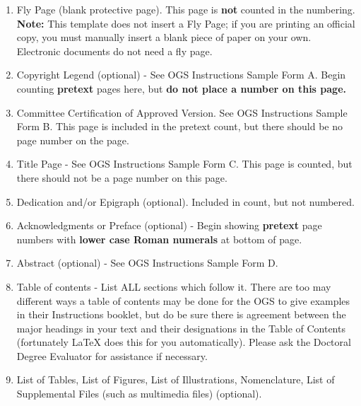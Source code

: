 \begin{enumerate}

\item Fly Page 
%
(blank protective page). This page is \textbf{not} counted in the numbering.
\textbf{Note:} This template does not insert a Fly Page; if you are printing
an official copy, you must manually insert a blank piece of paper on your own.
Electronic documents do not need a fly page.

\item Copyright Legend 
%
(optional) - See OGS Instructions Sample Form A.
Begin counting \textbf{pretext} pages here, but \textbf{do not
place a number on this page.} 

\item Committee Certification of Approved Version.
%
See OGS Instructions Sample Form B. This page is included in the
pretext count, but there should be no page number on the page.

\item Title Page - 
%
See OGS Instructions Sample Form C.
This page is counted, but there should not be a page number on this page.

\item Dedication 
%
and/or Epigraph (optional). 
%
Included in count, but not numbered.

\item Acknowledgments
%
or Preface 
%
(optional) - Begin showing \textbf{pretext} page numbers with \textbf{lower
case Roman numerals} at bottom of page.

\item Abstract 
%
(optional) - See OGS Instructions Sample Form D.

\item Table of contents -
%
List ALL sections which follow it. There are too may different ways a table
of contents may be done for the OGS to give examples in their Instructions
booklet, but do be sure there is agreement between the major headings in
your text and their designations in the Table of Contents (fortunately \LaTeX{}
does this for you automatically). Please ask the Doctoral Degree Evaluator
for assistance if necessary.

\item List of Tables,
%
List of Figures,
%
List of Illustrations, 
% 
Nomenclature,
%
List of Supplemental Files (such as multimedia files)
(optional).


\end{enumerate}
